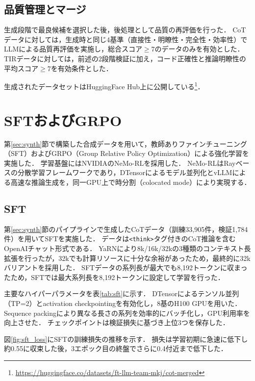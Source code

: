 \documentclass[
  platex, dvipdfmx,  %
]{nlp2026}
\newcommand{\code}[1]{\texttt{#1}}
\begin{document}
\subsection{品質管理とマージ}
\label{sec:quality}

生成段階で最良候補を選択した後，後処理として品質の再評価を行った．
CoTデータに対しては，生成時と同じ4基準（直接性・明瞭性・完全性・効率性）でLLMによる品質再評価を実施し，総合スコア$\geq$7のデータのみを有効とした．
TIRデータに対しては，前述の2段階検証に加え，コード正確性と推論明瞭性の平均スコア$\geq$7を有効条件とした．

生成されたデータセットはHuggingFace Hub上に公開している\footnote{\url{https://huggingface.co/datasets/ft-llm-team-mkj/cot-merged}}．

\section{SFTおよびGRPO}
\label{sec:sft_rl}

第\ref{sec:synth}節で構築した合成データを用いて，教師ありファインチューニング（SFT）およびGRPO（Group Relative Policy Optimization）\cite{grpo}による強化学習を実施した．
学習基盤にはNVIDIAのNeMo-RL\cite{nemorl}を採用した．
NeMo-RLはRayベースの分散学習フレームワークであり，DTensorによるモデル並列化とvLLM\cite{vllm}による高速な推論生成を，同一GPU上で時分割（colocated mode）により実現する．

\subsection{SFT}

第\ref{sec:synth}節のパイプラインで生成したCoTデータ（訓練33,905件，検証1,784件）を用いてSFTを実施した．
データは\code{<think>}タグ付きのCoT推論を含むOpenAIチャット形式である．
YaRNにより8k/16k/32kの3種類のコンテキスト長拡張を行ったが，32kでも計算リソースに十分な余裕があったため，最終的に32kバリアントを採用した．
SFTデータの系列長が最大でも8,192トークンに収まったため，SFTでは最大系列長を8,192トークンに設定して学習を行った．

主要なハイパーパラメータを表\ref{tab:sft}に示す．
DTensorによるテンソル並列（TP=2）とactivation checkpointingを有効化し，8基のH100 GPUを用いた．
Sequence packingにより異なる長さの系列を効率的にバッチ化し，GPU利用率を向上させた．
チェックポイントは検証損失に基づき上位3つを保存した．

図\ref{fig:sft_loss}にSFTの訓練損失の推移を示す．
損失は学習初期に急速に低下し約0.55に収束した後，3エポック目の終盤でさらに0.4付近まで低下した．
\end{document}
